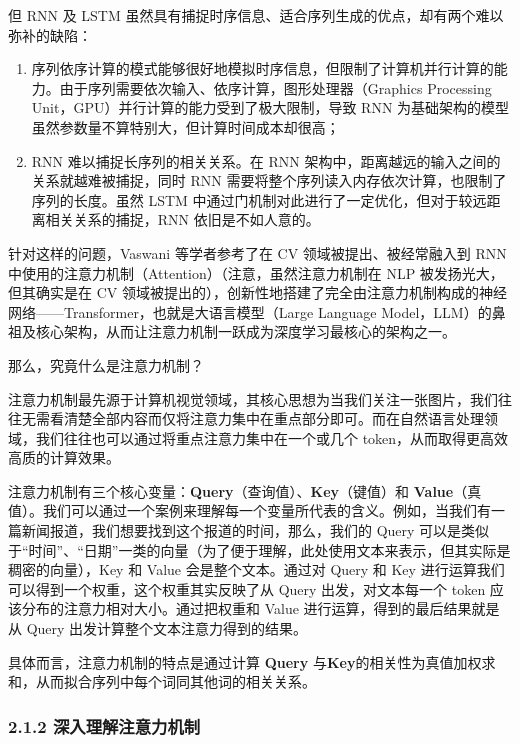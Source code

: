 \documentclass[12pt,a4paper]{book}
\begin{document}
但 RNN 及 LSTM
虽然具有捕捉时序信息、适合序列生成的优点，却有两个难以弥补的缺陷：

\begin{enumerate}
\def\labelenumi{\arabic{enumi}.}
\item
  序列依序计算的模式能够很好地模拟时序信息，但限制了计算机并行计算的能力。由于序列需要依次输入、依序计算，图形处理器（Graphics
  Processing Unit，GPU）并行计算的能力受到了极大限制，导致 RNN
  为基础架构的模型虽然参数量不算特别大，但计算时间成本却很高；
\item
  RNN 难以捕捉长序列的相关关系。在 RNN
  架构中，距离越远的输入之间的关系就越难被捕捉，同时 RNN
  需要将整个序列读入内存依次计算，也限制了序列的长度。虽然 LSTM
  中通过门机制对此进行了一定优化，但对于较远距离相关关系的捕捉，RNN
  依旧是不如人意的。
\end{enumerate}

针对这样的问题，Vaswani 等学者参考了在 CV 领域被提出、被经常融入到 RNN
中使用的注意力机制（Attention）（注意，虽然注意力机制在 NLP
被发扬光大，但其确实是在 CV
领域被提出的），创新性地搭建了完全由注意力机制构成的神经网络------Transformer，也就是大语言模型（Large
Language
Model，LLM）的鼻祖及核心架构，从而让注意力机制一跃成为深度学习最核心的架构之一。

那么，究竟什么是注意力机制？

注意力机制最先源于计算机视觉领域，其核心思想为当我们关注一张图片，我们往往无需看清楚全部内容而仅将注意力集中在重点部分即可。而在自然语言处理领域，我们往往也可以通过将重点注意力集中在一个或几个
token，从而取得更高效高质的计算效果。

注意力机制有三个核心变量：\textbf{Query}（查询值）、\textbf{Key}（键值）和
\textbf{Value}（真值）。我们可以通过一个案例来理解每一个变量所代表的含义。例如，当我们有一篇新闻报道，我们想要找到这个报道的时间，那么，我们的
Query
可以是类似于``时间''、``日期''一类的向量（为了便于理解，此处使用文本来表示，但其实际是稠密的向量），Key
和 Value 会是整个文本。通过对 Query 和 Key
进行运算我们可以得到一个权重，这个权重其实反映了从 Query
出发，对文本每一个 token 应该分布的注意力相对大小。通过把权重和 Value
进行运算，得到的最后结果就是从 Query 出发计算整个文本注意力得到的结果。

\hspace{0pt}具体而言，注意力机制的特点是通过计算 \textbf{Query}
与\textbf{Key}的相关性为真值加权求和，从而拟合序列中每个词同其他词的相关关系。

\subsubsection{2.1.2
深入理解注意力机制}\label{ux6df1ux5165ux7406ux89e3ux6ce8ux610fux529bux673aux5236}
\end{document}
